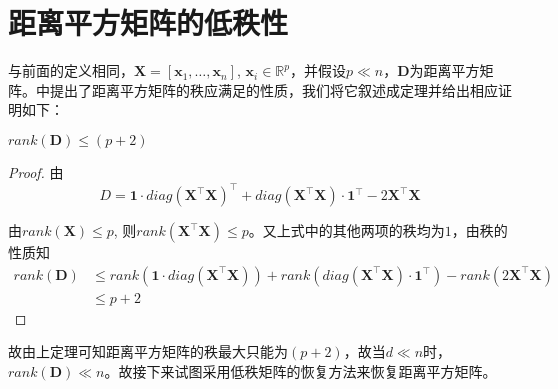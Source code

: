 \section{距离平方矩阵的低秩性}
与前面的定义相同，$\mathbf{X} = [\mathbf{x}_1, \dots, \mathbf{x}_n]$, $\mathbf{x}_i \in \mathbb{R}^p$，并假设$p\ll n$，$\mathbf{D}$为距离平方矩阵。\cite{dokmanic2015euclidean}中提出了距离平方矩阵的秩应满足的性质，我们将它叙述成定理并给出相应证明如下：
\begin{theorem}
$rank(\mathbf{D}) \leq (p+2)$
\end{theorem}

\begin{proof}
由
\begin{equation*}
    D = \mathbf{1} \cdot diag(\mathbf{X}^\intercal\mathbf{X})^\intercal + diag(\mathbf{X}^\intercal\mathbf{X}) \cdot \mathbf{1}^\intercal - 2 \mathbf{X}^\intercal\mathbf{X}
\end{equation*}

由$rank(\mathbf{X})\leq p$, 则$rank(\mathbf{X}^\intercal\mathbf{X}) \leq p$。又上式中的其他两项的秩均为$1$，由秩的性质知
\begin{equation*}
\begin{split}
    rank(\mathbf{D}) &\leq rank(\mathbf{1} \cdot diag(\mathbf{X}^\intercal \mathbf{X})) + rank(diag(\mathbf{X}^\intercal\mathbf{X}) \cdot \mathbf{1}^\intercal) - rank(2\mathbf{X}^\intercal\mathbf{X})\\
    &\leq p + 2
\end{split}
\end{equation*}
\end{proof}
故由上定理可知距离平方矩阵的秩最大只能为$(p + 2)$，故当$d\ll n$时，$rank(\mathbf{D})\ll n$。故接下来试图采用低秩矩阵的恢复方法来恢复距离平方矩阵。

